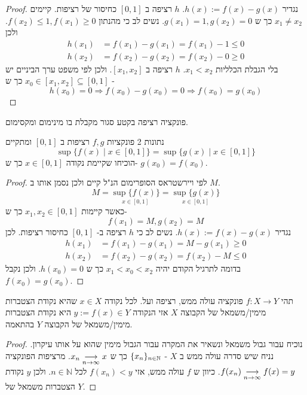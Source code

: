 \documentclass{article}
\begin{document}
\begin{proof}
נגדיר 
$h(x):=f(x)-g(x)$. 
$h$
רציפה ב 
$[0, 1]$
כחיסור של רציפות. קיימים 
$x_1\neq x_2$
כך ש 
$g(x_1)=1, g(x_2)=0$. 
נשים לב כי מהנתון 
$f(x_2)\leq 1, f(x_1)\geq 0$. 
ולכן 
\begin{align*}
h(x_1)&=f(x_1)-g(x_1)=f(x_1)-1\leq 0\\
h(x_2)&=f(x_2)-g(x_2)=f(x_2)-0\geq 0 
\end{align*}
בלי הגבלת הכלליות 
$x_1<x_2$.
$h$
רציפה ב 
$[x_1, x_2]$. 
ולכן לפי משפט ערך הביניים יש 
$x_0\in [x_1,x_2]\subseteq [0, 1]$
כך ש - 
\[h(x_0)=0\Rightarrow f(x_0)-g(x_0) = 0\Rightarrow f(x_0)=g(x_0)\]
\end{proof}

\begin{theorem}[ויירשטראס]
פונקציה רציפה בקטע סגור מקבלת בו מינימום ומקסימום.
\end{theorem}

\begin{exercise}
נתונות 2 פונקציות 
$f,g$
רציפות ב 
$[0, 1]$
ומתקיים 
\[\sup\{f(x)\mid x\in [0, 1]\} = \sup\{g(x)\mid x\in [0, 1]\}\]
הוכיחו שקיימת נקודה 
$x\in [0, 1]$
 כך ש- 
$g(x_0)=f(x_0)$.
\end{exercise}

\begin{proof}
לפי ויירשטראס הסופרימום הנ"ל קיים ולכן נסמן אותו ב
$M$. 
\[M=\underset{x\in[0, 1]}{\sup \{f(x)\}}=\underset{x\in[0, 1]}{\sup \{g(x)\}}\]
כאשר קיימות 
$x_1, x_2\in [0, 1]$
כך ש- 
\[f(x_1)=M, g(x_2)=M\]
נגדיר 
$h(x):=f(x)-g(x)$.
נשים לב כי 
$h$
רציפה ב- 
$[0, 1]$
כחיסור רציפות. לכן 
\begin{align*}
h(x_1)&= f(x_1)-g(x_1) = M-g(x_1)\geq 0 \\
h(x_2)&= f(x_2)-g(x_2) = f(x_2)-M\leq 0 
\end{align*}
בדומה לתרגיל הקודם יהיה 
$x_1<x_0<x_2$
כך ש 
$h(x_0)=0$.
ולכן נקבל 
$f(x_0)=g(x_0)$.
\end{proof}

\begin{lemma}
תהי 
$f:X\longrightarrow Y$
פונקציה עולה ממש, רציפה ועל. לכל נקודה 
$x\in X$
שהיא נקודת הצטברות מימין/משמאל של הקבוצה 
$X$
אזי הנקודה 
$y:=f(x)\in Y$
היא נקודת הצטברות מימין/משמאל של הקבוצה 
$Y$
בהתאמה. 
\end{lemma}

\begin{proof}
נוכיח עבור גבול משמאל ונשאיר את המקרה עבור הגבול מימין שהוא על אותו עיקרון. נניח שיש סדרה עולה ממש ב 
$X$
- 
$\{x_n\}_{n\in\mathbb{N}}$
כך ש 
$x_n\underset{n\rightarrow\infty}{\longrightarrow} x$. 
מרציפות הפונקציה 
$f(x_n)\underset{n\rightarrow\infty}{\longrightarrow} f(x) = y$. 
כיוון ש 
$f$
עולה ממש, אזי 
$f(x_n)<y$
לכל 
$n\in\mathbb{N}$.
ולכן 
$y$
נקודת הצטברות משמאל של 
$Y$.
\end{proof}
\end{document}
